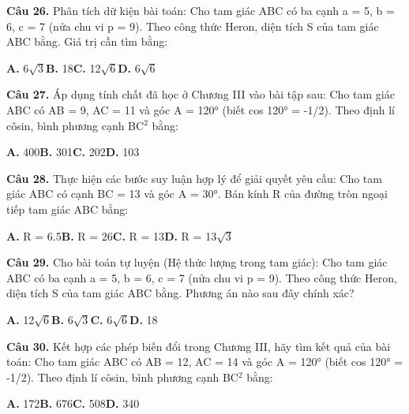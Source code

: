 \documentclass[11pt,a4paper]{article}
\begin{document}
\textbf{\color{primary} Câu 26.} Phân tích dữ kiện bài toán: Cho tam giác ABC có ba cạnh a = 5, b = 6, c = 7 (nửa chu vi p = 9). Theo công thức Heron, diện tích S của tam giác ABC bằng. Giá trị cần tìm bằng:\par
\hspace*{1.5em}\textbf{A.} 6$\sqrt{3}$\quad\quad \textbf{B.} 18\quad\quad \textbf{C.} 12$\sqrt{6}$\quad\quad \textbf{D.} 6$\sqrt{6}$\par\vspace{2pt}
\textbf{\color{primary} Câu 27.} Áp dụng tính chất đã học ở Chương III vào bài tập sau: Cho tam giác ABC có AB = 9, AC = 11 và góc A = 120° (biết cos 120° = -1/2). Theo định lí côsin, bình phương cạnh BC$^2$ bằng:\par
\hspace*{1.5em}\textbf{A.} 400\quad\quad \textbf{B.} 301\quad\quad \textbf{C.} 202\quad\quad \textbf{D.} 103\par\vspace{2pt}
\textbf{\color{primary} Câu 28.} Thực hiện các bước suy luận hợp lý để giải quyết yêu cầu: Cho tam giác ABC có cạnh BC = 13 và góc A = 30°. Bán kính R của đường tròn ngoại tiếp tam giác ABC bằng:\par
\hspace*{1.5em}\textbf{A.} R = 6.5\quad\quad \textbf{B.} R = 26\quad\quad \textbf{C.} R = 13\quad\quad \textbf{D.} R = 13$\sqrt{3}$\par\vspace{2pt}
\textbf{\color{primary} Câu 29.} Cho bài toán tự luyện (Hệ thức lượng trong tam giác): Cho tam giác ABC có ba cạnh a = 5, b = 6, c = 7 (nửa chu vi p = 9). Theo công thức Heron, diện tích S của tam giác ABC bằng. Phương án nào sau đây chính xác?\par
\hspace*{1.5em}\textbf{A.} 12$\sqrt{6}$\quad\quad \textbf{B.} 6$\sqrt{3}$\quad\quad \textbf{C.} 6$\sqrt{6}$\quad\quad \textbf{D.} 18\par\vspace{2pt}
\textbf{\color{primary} Câu 30.} Kết hợp các phép biến đổi trong Chương III, hãy tìm kết quả của bài toán: Cho tam giác ABC có AB = 12, AC = 14 và góc A = 120° (biết cos 120° = -1/2). Theo định lí côsin, bình phương cạnh BC$^2$ bằng:\par
\hspace*{1.5em}\textbf{A.} 172\quad\quad \textbf{B.} 676\quad\quad \textbf{C.} 508\quad\quad \textbf{D.} 340\par\vspace{2pt}
\end{document}

